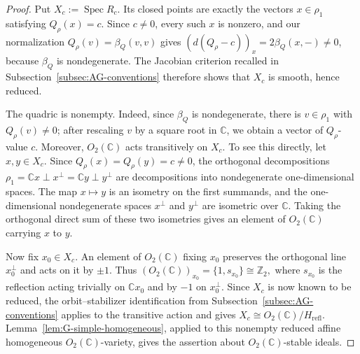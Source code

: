 \documentclass[12pt,leqno]{amsart}
\numberwithin{equation}{section} \newtheorem{thm}{Theorem}[section] \newtheorem{lem}[thm]{Lemma} \newtheorem{ex}[thm]{Example} \newtheorem{prop}[thm]{Proposition} \newtheorem{cor}[thm]{Corollary} \newtheorem{defi}[thm]{Definition} \newtheorem{rmk}[thm]{Remark} \newtheorem{notation}[thm]{Notation}
\newcommand{\Spec}{\operatorname{Spec}}
\newcommand{\Otwo}{O_2(\C)}
\def\Z{\mathbb{Z}} \def\N{\mathbb{N}} \def\A{\mathbb{A}} \def\C{\mathbb{C}} \def\R{\mathbb{R}} \def\Q{\mathbb{Q}} \def\F{\mathbb{F}}
\begin{document}
\begin{proof}
Put $X_c:=\Spec R_c$. Its closed points are exactly the vectors $x\in\rho_1$ satisfying $Q_\rho(x)=c$. Since $c\ne0$, every such $x$ is nonzero, and our normalization $Q_\rho(v)=\beta_Q(v,v)$ gives \((d(Q_\rho-c))_x=2\beta_Q(x,-)\ne0\), because $\beta_Q$ is nondegenerate. The Jacobian criterion recalled in Subsection~\ref{subsec:AG-conventions} therefore shows that $X_c$ is smooth, hence reduced.

The quadric is nonempty. Indeed, since $\beta_Q$ is nondegenerate, there is $v\in\rho_1$ with $Q_\rho(v)\ne0$; after rescaling $v$ by a square root in $\C$, we obtain a vector of $Q_\rho$-value $c$. Moreover, $\Otwo$ acts transitively on $X_c$. To see this directly, let $x,y\in X_c$. Since $Q_\rho(x)=Q_\rho(y)=c\ne0$, the orthogonal decompositions \(\rho_1=\C x\perp x^\perp=\C y\perp y^\perp\) are decompositions into nondegenerate one-dimensional spaces. The map $x\mapsto y$ is an isometry on the first summands, and the one-dimensional nondegenerate spaces $x^\perp$ and $y^\perp$ are isometric over $\C$. Taking the orthogonal direct sum of these two isometries gives an element of $\Otwo$ carrying $x$ to $y$.

Now fix $x_0\in X_c$. An element of $\Otwo$ fixing $x_0$ preserves the orthogonal line $x_0^\perp$ and acts on it by $\pm1$. Thus \((\Otwo)_{x_0}=\{1,s_{x_0}\}\cong\Z_2,\) where $s_{x_0}$ is the reflection acting trivially on $\C x_0$ and by $-1$ on $x_0^\perp$. Since $X_c$ is now known to be reduced, the orbit--stabilizer identification from Subsection~\ref{subsec:AG-conventions} applies to the transitive action and gives \(X_c\cong\Otwo/H_{\mathrm{refl}}.\) Lemma~\ref{lem:G-simple-homogeneous}, applied to this nonempty reduced affine homogeneous $\Otwo$-variety, gives the assertion about $\Otwo$-stable ideals.


\end{proof}
\end{document}
